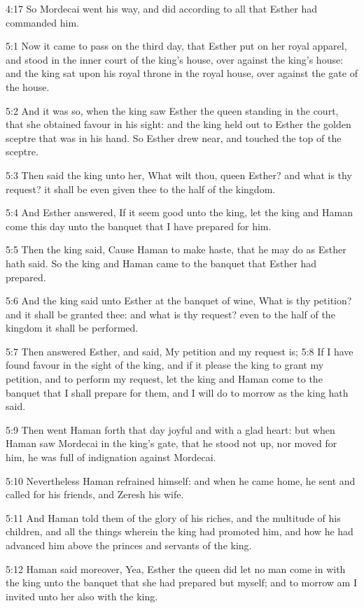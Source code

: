 4:17 So Mordecai went his way, and did according to all that Esther
had commanded him.

5:1 Now it came to pass on the third day, that Esther put on her royal
apparel, and stood in the inner court of the king's house, over
against the king's house: and the king sat upon his royal throne in
the royal house, over against the gate of the house.

5:2 And it was so, when the king saw Esther the queen standing in the
court, that she obtained favour in his sight: and the king held out to
Esther the golden sceptre that was in his hand. So Esther drew near,
and touched the top of the sceptre.

5:3 Then said the king unto her, What wilt thou, queen Esther? and
what is thy request? it shall be even given thee to the half of the
kingdom.

5:4 And Esther answered, If it seem good unto the king, let the king
and Haman come this day unto the banquet that I have prepared for him.

5:5 Then the king said, Cause Haman to make haste, that he may do as
Esther hath said. So the king and Haman came to the banquet that
Esther had prepared.

5:6 And the king said unto Esther at the banquet of wine, What is thy
petition? and it shall be granted thee: and what is thy request? even
to the half of the kingdom it shall be performed.

5:7 Then answered Esther, and said, My petition and my request is; 5:8
If I have found favour in the sight of the king, and if it please the
king to grant my petition, and to perform my request, let the king and
Haman come to the banquet that I shall prepare for them, and I will do
to morrow as the king hath said.

5:9 Then went Haman forth that day joyful and with a glad heart: but
when Haman saw Mordecai in the king's gate, that he stood not up, nor
moved for him, he was full of indignation against Mordecai.

5:10 Nevertheless Haman refrained himself: and when he came home, he
sent and called for his friends, and Zeresh his wife.

5:11 And Haman told them of the glory of his riches, and the multitude
of his children, and all the things wherein the king had promoted him,
and how he had advanced him above the princes and servants of the
king.

5:12 Haman said moreover, Yea, Esther the queen did let no man come in
with the king unto the banquet that she had prepared but myself; and
to morrow am I invited unto her also with the king.

